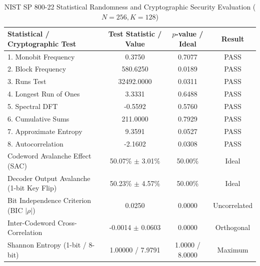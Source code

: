 
\begin{table}[t]
\centering
\caption{NIST SP 800-22 Statistical Randomness and Cryptographic Security Evaluation ($N=256, K=128$)}
\label{tab:nist_crypto}
\begin{tabular}{lccc}
\hline
\textbf{Statistical / Cryptographic Test} & \textbf{Test Statistic / Value} & \textbf{$p$-value / Ideal} & \textbf{Result} \\
\hline
1. Monobit Frequency & 0.3750 & 0.7077 & PASS \\
2. Block Frequency & 580.6250 & 0.0189 & PASS \\
3. Runs Test & 32492.0000 & 0.0311 & PASS \\
4. Longest Run of Ones & 3.3331 & 0.6488 & PASS \\
5. Spectral DFT & -0.5592 & 0.5760 & PASS \\
6. Cumulative Sums & 211.0000 & 0.7929 & PASS \\
7. Approximate Entropy & 9.3591 & 0.0527 & PASS \\
8. Autocorrelation & -2.1602 & 0.0308 & PASS \\
\hline
Codeword Avalanche Effect (SAC) & 50.07\% $\pm$ 3.01\% & 50.00\% & Ideal \\
Decoder Output Avalanche (1-bit Key Flip) & 50.23\% $\pm$ 4.57\% & 50.00\% & Ideal \\
Bit Independence Criterion (BIC $|\rho|$) & 0.0250 & 0.0000 & Uncorrelated \\
Inter-Codeword Cross-Correlation & -0.0014 $\pm$ 0.0603 & 0.0000 & Orthogonal \\
Shannon Entropy (1-bit / 8-bit) & 1.00000 / 7.9791 & 1.0000 / 8.0000 & Maximum \\
\hline
\end{tabular}
\end{table}

